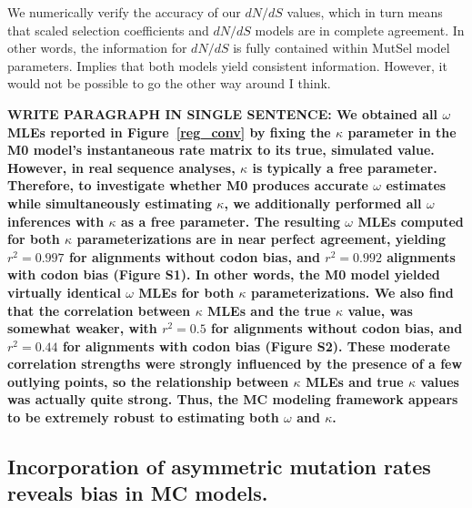 \documentclass{pnastwo}
\begin{document}
\begin{article}
We numerically verify the accuracy of our $dN/dS$ values, which in turn means that scaled selection coefficients and $dN/dS$ models are in complete agreement. In other words, the information for $dN/dS$ is fully contained within MutSel model parameters. Implies that both models yield consistent information. However, it would not be possible to go the other way around I think.


\textbf{WRITE PARAGRAPH IN SINGLE SENTENCE: We obtained all $\omega$ MLEs reported in Figure~\ref{reg_conv} by fixing the $\kappa$ parameter in the M0 model's instantaneous rate matrix to its true, simulated value. However, in real sequence analyses, $\kappa$ is typically a free parameter. Therefore, to investigate whether M0 produces accurate $\omega$ estimates while simultaneously estimating $\kappa$, we additionally performed all $\omega$ inferences with $\kappa$ as a free parameter. The resulting $\omega$ MLEs computed for both $\kappa$ parameterizations are in near perfect agreement, yielding $r^2=0.997$ for alignments without codon bias, and $r^2=0.992$ alignments with codon bias (Figure S1). In other words, the M0 model yielded virtually identical $\omega$ MLEs for both $\kappa$ parameterizations. We also find that the correlation between $\kappa$ MLEs and the true $\kappa$ value, was somewhat weaker, with $r^2=0.5$ for alignments without codon bias, and $r^2=0.44$ for alignments with codon bias (Figure S2). These moderate correlation strengths were strongly influenced by the presence of a few outlying points, so the relationship between $\kappa$ MLEs and true $\kappa$ values was actually quite strong. Thus, the MC modeling framework appears to be extremely robust to estimating both $\omega$ and $\kappa$.}



\subsection*{Incorporation of asymmetric mutation rates reveals bias in MC models.}
		

\end{article}
\end{document}

